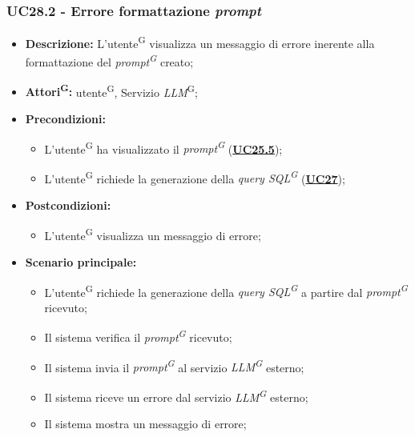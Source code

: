 \subsubsection{UC28.2 - Errore formattazione \textit{prompt}}
\label{sec:UC28.2}
\begin{itemize}
	\item \textbf{Descrizione:} L'utente\textsuperscript{G} visualizza un messaggio di errore inerente alla formattazione del \textit{prompt\textsuperscript{G}} creato;
	\item \textbf{Attori\textsuperscript{G}:} utente\textsuperscript{G}, Servizio \textit{LLM}\textsuperscript{G};
	\item \textbf{Precondizioni:} 
	\begin{itemize}
		\item L'utente\textsuperscript{G} ha visualizzato il \textit{prompt\textsuperscript{G}} (\hyperref[sec:UC25.5]{\textbf{UC25.5}});
		\item L'utente\textsuperscript{G} richiede la generazione della \textit{query SQL\textsuperscript{G}} (\hyperref[sec:UC27]{\textbf{UC27}});
	\end{itemize}
	\item \textbf{Postcondizioni:} 
	\begin{itemize}
		\item L'utente\textsuperscript{G} visualizza un messaggio di errore;
	\end{itemize}
	\item \textbf{Scenario principale:}
	\begin{itemize}
		\item L'utente\textsuperscript{G} richiede la generazione della \textit{query SQL\textsuperscript{G}} a partire dal \textit{prompt\textsuperscript{G}} ricevuto;
		\item Il sistema verifica il \textit{prompt\textsuperscript{G}} ricevuto;
		\item Il sistema invia il \textit{prompt\textsuperscript{G}} al servizio \textit{LLM\textsuperscript{G}} esterno;
		\item Il sistema riceve un errore dal servizio \textit{LLM\textsuperscript{G}} esterno;
		\item Il sistema mostra un messaggio di errore;
	\end{itemize}
\end{itemize}

